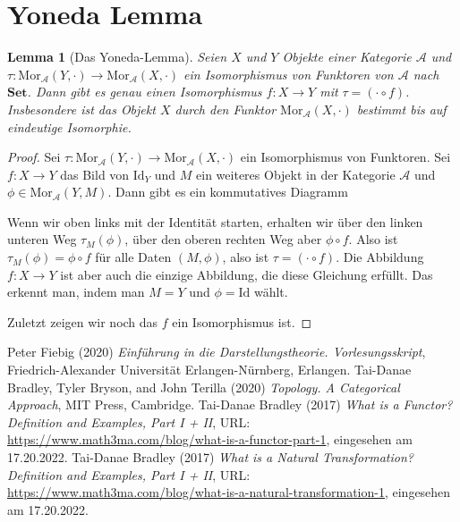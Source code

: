 \documentclass[leqno]{article}
\theoremstyle{plain}
\newtheorem{lem}[thm]{Lemma}
\theoremstyle{definition}
\theoremstyle{remark}
\begin{document}
\section{Yoneda Lemma}


\begin{lem}[Das Yoneda-Lemma]
Seien $X$ und $Y$ Objekte einer Kategorie $\mathcal{A}$ und $\tau: \text{Mor}_{\mathcal{A}}(Y,\cdot) \rightarrow \text{Mor}_{\mathcal{A}}(X,\cdot)$ ein Isomorphismus von Funktoren von $\mathcal{A}$ nach $\textbf{Set}$. Dann gibt es genau einen Isomorphismus $f: X \rightarrow Y$ mit $\tau = (\cdot \circ f)$. Insbesondere ist das Objekt $X$ durch den Funktor $\text{Mor}_{\mathcal{A}}(X,\cdot)$ bestimmt bis auf eindeutige Isomorphie.
\end{lem}

\begin{proof}
Sei $\tau: \text{Mor}_{\mathcal{A}}(Y,\cdot) \rightarrow \text{Mor}_{\mathcal{A}}(X,\cdot)$ ein Isomorphismus von Funktoren. Sei $f: X \rightarrow Y$ das Bild von $\text{Id}_Y$ und $M$ ein weiteres Objekt in der Kategorie $\mathcal{A}$ und $\phi \in \text{Mor}_\mathcal{A}(Y,M)$. Dann gibt es ein kommutatives Diagramm


Wenn wir oben links mit der Identität starten, erhalten wir über den linken unteren Weg $\tau_M(\phi)$, über den oberen rechten Weg aber $\phi \circ f$. Also ist $\tau_M(\phi) = \phi \circ f$ für alle Daten $(M,\phi)$, also ist $\tau = (\cdot \circ f)$. Die Abbildung $f:X \rightarrow Y$ ist aber auch die einzige Abbildung, die diese Gleichung erfüllt. Das erkennt man, indem man $M = Y$ und $\phi = \text{Id}$ wählt.

Zuletzt zeigen wir noch das $f$ ein Isomorphismus ist.
\end{proof}

\begin{thebibliography}{9}
 Peter Fiebig (2020) \emph{Einführung in die Darstellungstheorie. Vorlesungsskript}, Friedrich-Alexander Universität Erlangen-Nürnberg, Erlangen.
 Tai-Danae Bradley, Tyler Bryson, and John Terilla (2020) \emph{Topology. A Categorical Approach}, MIT Press, Cambridge.
 Tai-Danae Bradley (2017) \emph{What is a Functor? Definition and Examples, Part I + II}, URL: \url{https://www.math3ma.com/blog/what-is-a-functor-part-1}, eingesehen am 17.20.2022.
 Tai-Danae Bradley (2017) \emph{What is a Natural Transformation? Definition and Examples, Part I + II}, URL: \url{https://www.math3ma.com/blog/what-is-a-natural-transformation-1}, eingesehen am 17.20.2022.
\end{thebibliography}
\end{document}
